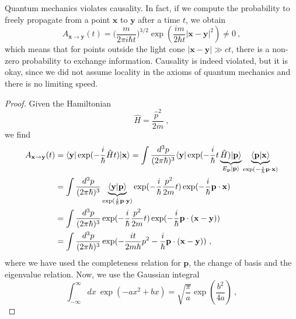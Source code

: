     Quantum mechanics violates causality. In fact, if we compute the probability to freely propagate from a point $\mathbf x$ to $\mathbf y$ after a time $t$, we obtain 
    \begin{equation*}
        A_{\mathbf x \rightarrow \mathbf y} (t) = \Big ( \frac{m}{2 \pi i \hbar t} \Big)^{3/2} \exp(\frac{i m}{2 \hbar t} |\mathbf x - \mathbf y|^2) \neq 0 ~,
    \end{equation*}
    which means that for points outside the light cone $|\mathbf x - \mathbf y| \gg ct$, there is a non-zero probability to exchange information. Causality is indeed violated, but it is okay, since we did not assume locality in the axioms of quantum mechanics and there is no limiting speed.
    \begin{proof}
        Given the Hamiltonian 
        \begin{equation*}
            \hat H = \frac{\hat p^2}{2m} ~,
        \end{equation*}
        we find 
        \begin{equation*}
        \begin{aligned}
            A_{\mathbf x \rightarrow \mathbf y} (t) & = \langle\mathbf y\vert \exp(- \frac{i}{\hbar} \hat H t) \vert\mathbf x\rangle = \int \frac{d^3 p}{(2 \pi \hbar)^3} \langle\mathbf y\vert \exp(- \frac{i}{\hbar} t \underbrace{\hat H) \vert\mathbf p\rangle}_{E_{\mathbf p} \vert\mathbf p\rangle} \underbrace{\langle\mathbf p\vert\mathbf x\rangle }_{\exp(- \frac{i}{\hbar} \mathbf p \cdot \mathbf x)} \\ & = \int \frac{d^3 p}{(2 \pi \hbar)^3} \underbrace{\langle\mathbf y\vert\mathbf p\rangle}_{\exp( \frac{i}{\hbar} \mathbf p \cdot \mathbf y)} \exp(- \frac{i}{\hbar} \frac{p^2}{2m} t)  \exp(- \frac{i}{\hbar} \mathbf p \cdot \mathbf x) \\ & = \int \frac{d^3 p}{(2 \pi \hbar)^3} \exp(- \frac{i}{\hbar} \frac{p^2}{2m} t)  \exp(- \frac{i}{\hbar} \mathbf p \cdot (\mathbf x - \mathbf y)) \\ & = \int \frac{d^3 p}{(2 \pi \hbar)^3} \exp(- \frac{it}{2m\hbar} p^2 - \frac{i}{\hbar} \mathbf p \cdot (\mathbf x - \mathbf y)) ~,
        \end{aligned}
        \end{equation*}
        where we have used the completeness relation for $\mathbf p$, the change of basis and the eigenvalue relation. Now, we use the Gaussian integral 
        \begin{equation*}
            \int_{-\infty}^\infty dx ~ \exp(- a x^2 + bx) = \sqrt{\frac{\pi}{a}}  \exp(\frac{b^2}{4 a}) ~,

\end{equation*}
\end{proof}
